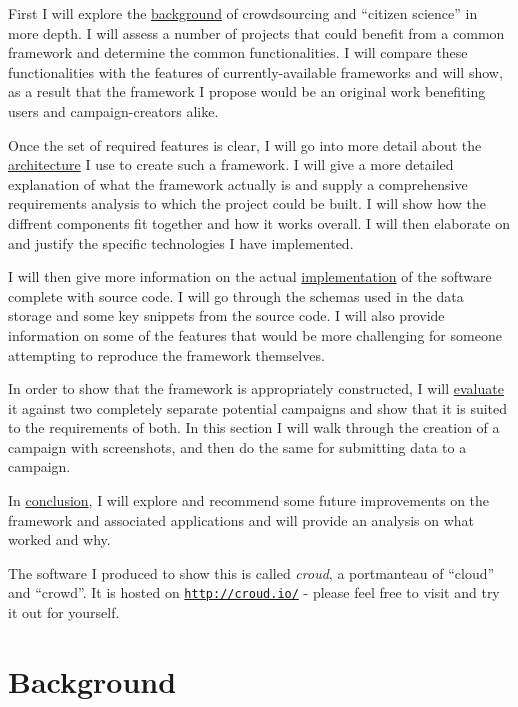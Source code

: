 \documentclass{article}
\let\oldsection\section
\renewcommand\section{\clearpage\oldsection}
\begin{document}
		First I will explore the \hyperref[sec:background]{background} of crowdsourcing and ``citizen science'' in more depth. I will assess a number of projects that could benefit from a common framework and determine the common functionalities. I will compare these functionalities with the features of currently-available frameworks and will show, as a result that the framework I propose would be an original work benefiting users and campaign-creators alike.

		Once the set of required features is clear, I will go into more detail about the \hyperref[sec:architecture]{architecture} I use to create such a framework. I will give a more detailed explanation of what the framework actually is and supply a comprehensive requirements analysis to which the project could be built. I will show how the diffrent components fit together and how it works overall. I will then elaborate on and justify the specific technologies I have implemented.

		I will then give more information on the actual \hyperref[sec:implementation]{implementation} of the software complete with source code. I will go through the schemas used in the data storage and some key snippets from the source code. I will also provide information on some of the features that would be more challenging for someone attempting to reproduce the framework themselves.

		In order to show that the framework is appropriately constructed, I will \hyperref[sec:evaluation]{evaluate} it against two completely separate potential campaigns and show that it is suited to the requirements of both. In this section I will walk through the creation of a campaign with screenshots, and then do the same for submitting data to a campaign.

		In \hyperref[sec:conclusion]{conclusion}, I will explore and recommend some future improvements on the framework and associated applications and will provide an analysis on what worked and why.

		The software I produced to show this is called \textit{croud}, a portmanteau of ``cloud'' and ``crowd''. It is hosted on \href{http://croud.io/}{\texttt{http://croud.io/}} - please feel free to visit and try it out for yourself.

	\section{Background}
	\label{sec:background}
\end{document}
